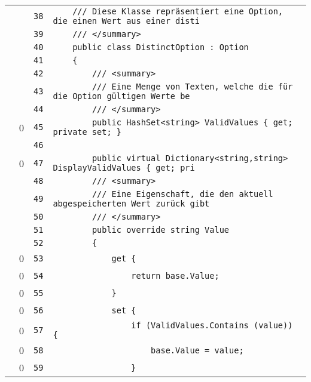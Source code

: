 \documentclass[a4paper,10pt]{article}
\begin{document}
\begin{longtable}[l]{lrrl}
\cellcolor{gray} &  & \verb~38~ & \verb~    /// Diese Klasse repräsentiert eine Option, die einen Wert aus einer disti~\\
\cellcolor{gray} &  & \verb~39~ & \verb~    /// </summary>~\\
\cellcolor{gray} &  & \verb~40~ & \verb~    public class DistinctOption : Option~\\
\cellcolor{gray} &  & \verb~41~ & \verb~    {~\\
\cellcolor{gray} &  & \verb~42~ & \verb~        /// <summary>~\\
\cellcolor{gray} &  & \verb~43~ & \verb~        /// Eine Menge von Texten, welche die für die Option gültigen Werte be~\\
\cellcolor{gray} &  & \verb~44~ & \verb~        /// </summary>~\\
\cellcolor{red} & 0 & \verb~45~ & \verb~        public HashSet<string> ValidValues { get; private set; }~\\
\cellcolor{gray} &  & \verb~46~ & \verb~~\\
\cellcolor{red} & 0 & \verb~47~ & \verb~        public virtual Dictionary<string,string> DisplayValidValues { get; pri~\\
\cellcolor{gray} &  & \verb~48~ & \verb~        /// <summary>~\\
\cellcolor{gray} &  & \verb~49~ & \verb~        /// Eine Eigenschaft, die den aktuell abgespeicherten Wert zurück gibt~\\
\cellcolor{gray} &  & \verb~50~ & \verb~        /// </summary>~\\
\cellcolor{gray} &  & \verb~51~ & \verb~        public override string Value~\\
\cellcolor{gray} &  & \verb~52~ & \verb~        {~\\
\cellcolor{red} & 0 & \verb~53~ & \verb~            get {~\\
\cellcolor{red} & 0 & \verb~54~ & \verb~                return base.Value;~\\
\cellcolor{red} & 0 & \verb~55~ & \verb~            }~\\
\cellcolor{red} & 0 & \verb~56~ & \verb~            set {~\\
\cellcolor{red} & 0 & \verb~57~ & \verb~                if (ValidValues.Contains (value)) {~\\
\cellcolor{red} & 0 & \verb~58~ & \verb~                    base.Value = value;~\\
\cellcolor{red} & 0 & \verb~59~ & \verb~                }~\\

\end{longtable}
\end{document}
